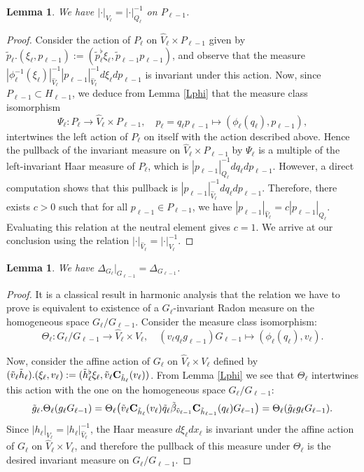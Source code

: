 \documentclass[a4paper,11pt,reqno]{amsart}
\numberwithin{equation}{section}
\newtheorem{lemma}[theorem]{Lemma}
\theoremstyle{remark}
\theoremstyle{definition}
\newcommand\bp{\begin{proof}}
\newcommand\ep{\end{proof}}
\begin{document}
\begin{lemma}
\label{IDMF}
We have $|\cdot|_{V_\ell}=|\cdot|_{Q_\ell}^{-1}$ on $P_{\ell-1}$.
\end{lemma}
\begin{proof}
Consider the action of $P_\ell$ on $\hat V_\ell\times P_{\ell-1}$ given  by
$\tilde p_\ell.(\xi_\ell, p_{\ell-1}):=(\tilde p_\ell^\flat \xi_\ell, \tilde p_{\ell-1} p_{\ell-1})$, and observe that the measure
$|\phi_\ell^{-1}(\xi_\ell)|_{\hat V_\ell}^{-1}|p_{\ell-1}|_{\hat V_\ell}^{-1} d\xi_\ell dp_{\ell-1}$ is invariant under this action.
Now,  since $P_{\ell-1}\subset H_{\ell-1}$, we deduce from Lemma \ref{Lphi} that the  measure class  isomorphism
$$
\Psi_\ell:P_\ell\to \hat V_\ell\times P_{\ell-1},\quad p_\ell=q_\ell p_{\ell-1}\mapsto (\phi_\ell(q_\ell),p_{\ell-1}),
$$
intertwines the left action of $P_\ell$ on itself with the action described above. Hence the pullback of the invariant measure on $\hat V_\ell\times P_{\ell-1}$   by
$\Psi_\ell$
is a multiple of the left-invariant Haar measure of $P_\ell$, which is $|p_{\ell-1}|_{Q_\ell}^{-1} dq_\ell dp_{\ell-1}$.
However, a direct computation shows  that this pullback  is  $|p_{\ell-1}|_{\hat V_\ell}^{-1} dq_\ell dp_{\ell-1}$. Therefore, there exists $c>0$ such that
for all $p_{\ell-1}\in P_{\ell-1}$, we have
$|p_{\ell-1}|_{\hat V_\ell}=c|p_{\ell-1}|_{Q_\ell}$. Evaluating this relation at the neutral element gives $c=1$.
We arrive at our conclusion  using the relation $|\cdot|_{\hat V_\ell}=|\cdot|_{V_\ell}^{-1}$.
\end{proof}



\begin{lemma}
\label{L1}
We have $\Delta_{G_\ell}\big|_{G_{\ell-1}}=\Delta_{G_{\ell-1}}$.
\end{lemma}
\bp
It is a classical result in harmonic analysis that the relation we have to prove is equivalent to existence of a $G_\ell$-invariant Radon measure
on the homogeneous space $G_\ell/G_{\ell-1}$. Consider the   measure class  isomorphism:
\begin{equation*}
\Theta_\ell:G_\ell/G_{\ell-1}\to \hat V_\ell\times V_\ell,\quad (v_\ell q_\ell g_{\ell-1}) G_{\ell-1}\mapsto (\phi_\ell(q_\ell),v_\ell).
\end{equation*}


Now, consider  the affine  action of $G_\ell$  on $ \hat V_\ell\times V_\ell$
defined by $(\tilde  v_\ell \tilde h_\ell ).(\xi_\ell, v_\ell):=(\tilde  h_\ell ^\flat\xi_\ell,\tilde v_\ell{\bf C}_{\tilde h_\ell}  ( v_\ell)  )$.
From Lemma \ref{Lphi} we see that $\Theta_\ell$ intertwines this action with  the one on the homogeneous space $G_\ell/G_{\ell-1}$:
$$
\tilde g_\ell.\Theta_\ell(g_\ell G_{\ell-1})=
\Theta_\ell\big(\tilde v_\ell{\bf C}_{\tilde h_\ell}  ( v_\ell)\tilde q_\ell\tilde\beta_{\tilde v_{\ell-1}}{\bf C}_{\tilde h_{\ell-1}}(q_\ell)G_{\ell-1}\big)
=\Theta_\ell(\tilde g_\ell g_\ell G_{\ell-1}).
$$
Since $|h_\ell|_{V_\ell}=|h_\ell|_{\hat V_\ell}^{-1}$,  the Haar measure $d\xi_\ell dx_\ell$ is invariant under the affine  action
of $G_\ell$ on $ \hat V_\ell\times V_\ell$, and therefore the pullback of this measure under $\Theta_\ell$ is the desired
invariant measure on  $G_\ell/G_{\ell-1}$.
\ep
\end{document}
